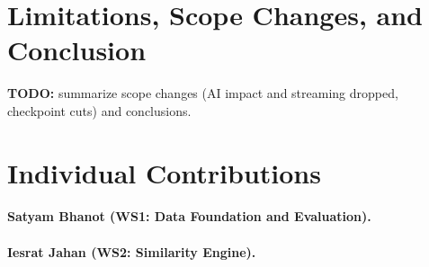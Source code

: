 \documentclass[11pt,twocolumn]{article}
\begin{document}
\section{Limitations, Scope Changes, and Conclusion}
\ifdefined\wsfourConclusion\wsfourConclusion\else
\textbf{TODO:} summarize scope changes (AI impact and streaming dropped, checkpoint cuts) and conclusions.
\fi

\section{Individual Contributions}
\paragraph{Satyam Bhanot (WS1: Data Foundation and Evaluation).}
\wsoneContribution
\paragraph{Iesrat Jahan (WS2: Similarity Engine).}
\wstwoContribution
\ifdefined\wsthreeContribution\wsthreeContribution\fi
\ifdefined\wsfourContribution\wsfourContribution\fi



\end{document}
